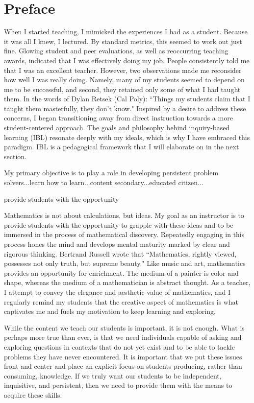 \chapter*{Preface}


When I started teaching, I mimicked the experiences I had as a student. Because it was all I knew, I lectured. By standard metrics, this seemed to work out just fine. Glowing student and peer evaluations, as well as reoccurring teaching awards, indicated that I was effectively doing my job. People consistently told me that I was an excellent teacher. However, two observations made me reconsider how well I was really doing. Namely, many of my students seemed to depend on me to be successful, and second, they retained only some of what I had taught them. In the words of Dylan Retsek (Cal Poly):
``Things my students claim that I taught them masterfully, they don't know."
Inspired by a desire to address these concerns, I began transitioning away from direct instruction towards a more student-centered approach. The goals and philosophy behind inquiry-based learning (IBL) resonate deeply with my ideals, which is why I have embraced this paradigm. IBL is a pedagogical framework that I will elaborate on in the next section.


My primary objective is to play a role in developing persistent problem solvers...learn how to learn...content secondary...educated citizen...

provide students with the opportunity 


Mathematics is not about calculations, but ideas. My goal as an instructor is to provide students with the opportunity to grapple with these ideas and to be immersed in the process of mathematical discovery. Repeatedly engaging in this process hones the mind and develops mental maturity marked by clear and rigorous thinking. Bertrand Russell wrote that
``Mathematics, rightly viewed, possesses not only truth, but supreme beauty."
Like music and art, mathematics provides an opportunity for enrichment. The medium of a painter is color and shape, whereas the medium of a mathematician is abstract thought. As a teacher, I attempt to convey the elegance and aesthetic value of mathematics, and I regularly remind my students that the creative aspect of mathematics is what captivates me and fuels my motivation to keep learning and exploring.

While the content we teach our students is important, it is not enough. What is perhaps more true than ever, is that we need individuals capable of asking and exploring questions in contexts that do not yet exist and to be able to tackle problems they have never encountered. It is important that we put these issues front and center and place an explicit focus on students producing, rather than consuming, knowledge. If we truly want our students to be independent, inquisitive, and persistent, then we need to provide them with the means to acquire these skills.


